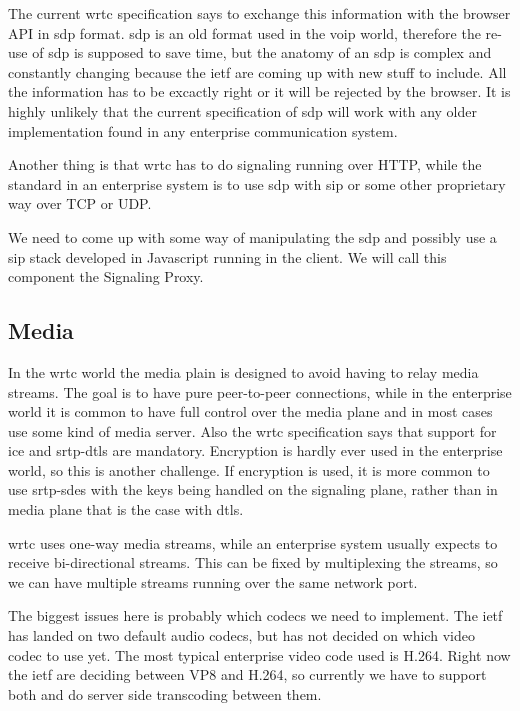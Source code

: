 The current \gls{wrtc} specification says to exchange this information with the browser API in \gls{sdp} format. \gls{sdp} is an old format used in the \gls{voip} world, therefore the re-use of \gls{sdp} is supposed to save time, but the anatomy of an \gls{sdp} is complex and constantly changing because the \gls{ietf} are coming up with new stuff to include. All the information has to be excactly right or it will be rejected by the browser. It is highly unlikely that the current specification of \gls{sdp} will work with any older implementation found in any enterprise communication system.

Another thing is that \gls{wrtc} has to do signaling running over HTTP, while the standard in an enterprise system is to use \gls{sdp} with \gls{sip} or some other proprietary way over TCP or UDP.

We need to come up with some way of manipulating the \gls{sdp} and possibly use a \gls{sip} stack developed in Javascript running in the client. We will call this component the Signaling Proxy.

\subsection{Media}
In the \gls{wrtc} world the media plain is designed to avoid having to relay media streams. The goal is to have pure peer-to-peer connections, while in the enterprise world it is common to have full control over the media plane and in most cases use some kind of media server. Also the \gls{wrtc} specification says that support for \gls{ice} and \gls{srtp}-\gls{dtls} are mandatory. Encryption is hardly ever used in the enterprise world, so this is another challenge. If encryption is used, it is more common to use \gls{srtp}-\gls{sdes} with the keys being handled on the signaling plane, rather than in media plane that is the case with \gls{dtls}.

\gls{wrtc} uses one-way media streams, while an enterprise system usually expects to receive bi-directional streams. This can be fixed by multiplexing the streams, so we can have multiple streams running over the same network port.

The biggest issues here is probably which codecs we need to implement. The \gls{ietf} has landed on two default audio codecs, but has not decided on which video codec to use yet. The most typical enterprise video code used is H.264. Right now the \gls{ietf} are deciding between VP8 and H.264, so currently we have to support both and do server side transcoding between them.

